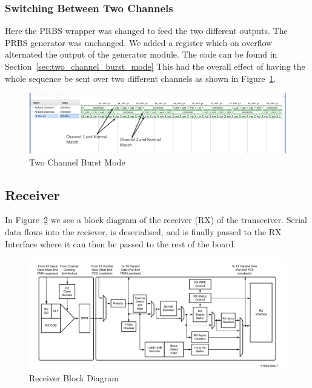 \subsubsection{Switching Between Two Channels}%
\label{ssub:switching_between_two_channels}
Here the PRBS wrapper was changed to feed the two different outputs. The PRBS
generator was unchanged. We added a register which on overflow alternated the
output of the generator module. The code can be found in Section~\ref{sec:two_channel_burst_mode} 
This had the overall effect of having the whole sequence be sent over two
different channels as shown in Figure~\ref{fig:two_channel_tx}.


\begin{figure}[ht]
    \centering
    \hspace*{-3cm}\includegraphics[width=1.4\linewidth]{img/two_channel.png}
    \caption{Two Channel Burst Mode}%
    \label{fig:two_channel_tx}
\end{figure}

\cleardoublepage

\subsection{Receiver}%
\label{sub:receiver}
In Figure~\ref{fig:receiver_block} we see a block diagram of the receiver
(RX) of the transceiver. Serial data flows into the reciever, is deserialised,
and is finally passed to the RX Interface where it can then be passed to the
rest of the board. 
\begin{figure}[ht]
    \centering
    \hspace*{-1cm}\includegraphics[width=1.2\linewidth]{img/receiver_block.png}
    \caption{Receiver Block Diagram \cite{GTY_guide}}%
    \label{fig:receiver_block}
\end{figure}

